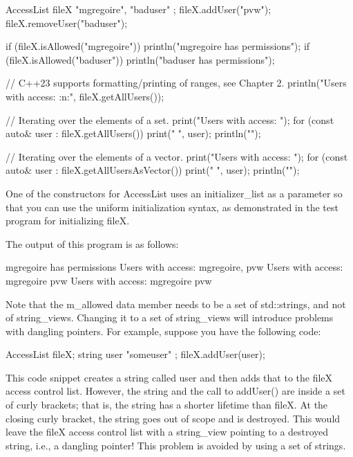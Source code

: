 \begin{cpp}
AccessList fileX { "mgregoire", "baduser" };
fileX.addUser("pvw");
fileX.removeUser("baduser");

if (fileX.isAllowed("mgregoire")) { println("mgregoire has permissions"); }
if (fileX.isAllowed("baduser")) { println("baduser has permissions"); }

// C++23 supports formatting/printing of ranges, see Chapter 2.
println("Users with access: {:n:}", fileX.getAllUsers());

// Iterating over the elements of a set.
print("Users with access: ");
for (const auto& user : fileX.getAllUsers()) { print("{} ", user); }
println("");

// Iterating over the elements of a vector.
print("Users with access: ");
for (const auto& user : fileX.getAllUsersAsVector()) { print("{} ", user); }
println("");
\end{cpp}

One of the constructors for AccessList uses an initializer\_list as a parameter so that you can use the uniform initialization syntax, as demonstrated in the test program for initializing fileX.

The output of this program is as follows:

\begin{shell}
mgregoire has permissions
Users with access: mgregoire, pvw
Users with access: mgregoire pvw
Users with access: mgregoire pvw
\end{shell}

Note that the m\_allowed data member needs to be a set of std::strings, and not of string\_views. Changing it to a set of string\_views will introduce problems with dangling pointers. For example, suppose you have the following code:

\begin{cpp}
AccessList fileX;
{
    string user { "someuser" };
    fileX.addUser(user);
}
\end{cpp}

This code snippet creates a string called user and then adds that to the fileX access control list. However, the string and the call to addUser() are inside a set of curly brackets; that is, the string has a shorter lifetime than fileX. At the closing curly bracket, the string goes out of scope and is destroyed. This would leave the fileX access control list with a string\_view pointing to a destroyed string, i.e., a dangling pointer! This problem is avoided by using a set of strings.

